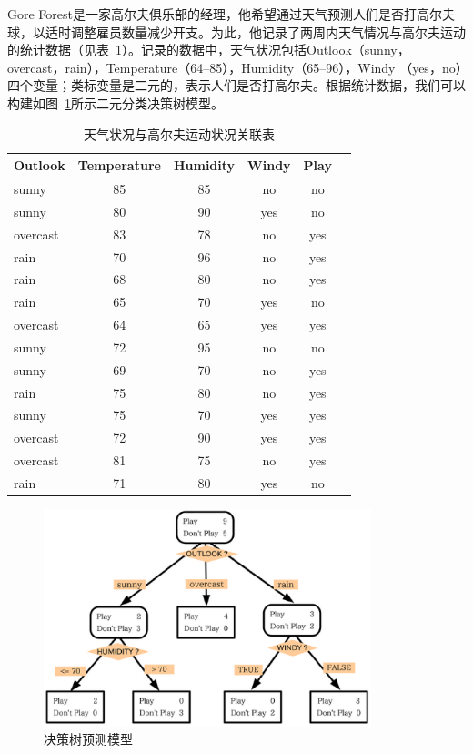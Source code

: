 \begin{example}
Gore Forest是一家高尔夫俱乐部的经理，他希望通过天气预测人们是否打高尔夫球，以适时调整雇员数量减少开支。为此，他记录了两周内天气情况与高尔夫运动的统计数据（见表~\ref{tbl:golf}）。记录的数据中，天气状况包括Outlook（sunny，overcast，rain），Temperature（64--85），Humidity（65--96），Windy
（yes，no）四个变量；类标变量是二元的，表示人们是否打高尔夫。根据统计数据，我们可以构建如图~\ref{fig:decisiontree}所示二元分类决策树模型。
\begin{table}[htbp]
    \centering
    \begin{tabular}{|l|c|c|c|c|c|}
      \hline
        Outlook & Temperature & Humidity & Windy & Play\\
        \hline
        sunny & 85 & 85 & no & no\\
        \hline
        sunny & 80 & 90 & yes & no\\
        \hline
        overcast & 83 & 78 & no & yes\\
        \hline
        rain & 70 & 96 & no & yes\\
        \hline
        rain & 68 & 80 & no & yes\\
        \hline
        rain & 65 & 70 & yes & no\\
        \hline
        overcast & 64 & 65 & yes & yes\\
        \hline
        sunny & 72 & 95 & no & no\\
        \hline
        sunny & 69 & 70 & no & yes\\
        \hline
        rain & 75 & 80 & no & yes\\
        \hline
        sunny & 75 & 70 & yes & yes\\
        \hline
        overcast & 72 & 90 & yes & yes\\
        \hline
        overcast & 81 & 75 & no & yes\\
        \hline
        rain & 71 & 80 & yes & no\\
      \hline
    \end{tabular}
    \caption{天气状况与高尔夫运动状况关联表}
    \label{tbl:golf}
\end{table}

\begin{figure}[htbp]
  \centering
  \includegraphics[width=0.85\textwidth]{figures/decisiontree.eps}
  \caption{决策树预测模型}\label{fig:decisiontree}
\end{figure}

\end{example}

